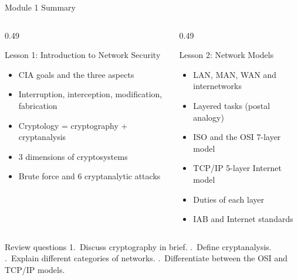 \documentclass[aspectratio=169,11pt,xcolor={table}]{beamer}
\begin{document}
\begin{frame}{Module 1 Summary}
  \begin{columns}[T]
    \begin{column}{0.49\textwidth}
      \begin{block}{Lesson 1: Introduction to Network Security}
        \small
        \begin{itemize}\setlength{\itemsep}{1pt}
          \item CIA goals and the three aspects
          \item Interruption, interception, modification, fabrication
          \item Cryptology = cryptography + cryptanalysis
          \item 3 dimensions of cryptosystems
          \item Brute force and 6 cryptanalytic attacks
        \end{itemize}
      \end{block}
    \end{column}
    \begin{column}{0.49\textwidth}
      \begin{exampleblock}{Lesson 2: Network Models}
        \small
        \begin{itemize}\setlength{\itemsep}{1pt}
          \item LAN, MAN, WAN and internetworks
          \item Layered tasks (postal analogy)
          \item ISO and the OSI 7-layer model
          \item TCP/IP 5-layer Internet model
          \item Duties of each layer
          \item IAB and Internet standards
        \end{itemize}
      \end{exampleblock}
    \end{column}
  \end{columns}
  \vspace{1mm}
  \begin{alertblock}{Review questions}
    \small
    1.~Discuss cryptography in brief. .~Define cryptanalysis. .~Explain different categories of networks. .~Differentiate between the OSI and TCP/IP models.
  \end{alertblock}
\end{frame}
\end{document}
